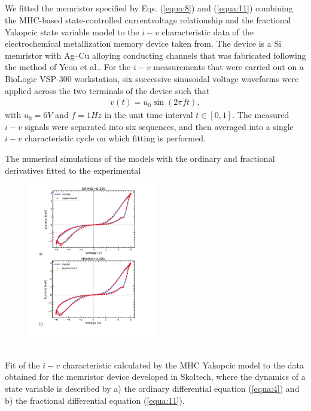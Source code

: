 \documentclass[10pt]{article}
\begin{document}
\begin{multicols}{2}
{        \section{ }
        }
        We fitted the memristor specified by Eqs. (\ref{equa:8}) and (\ref{equa:11}) combining the MHC-based state-controlled currentvoltage relationship and the fractional Yakopcic state variable model to the $i-v$ characteristic data of the electrochemical metallization memory device taken from. The device is a Si memristor with Ag–Cu alloying conducting channels that was fabricated following the method of Yeon et al.. For the $i-v$ measurements that were carried out on a BioLogic VSP-300 workstation, six successive sinusoidal voltage waveforms were applied across the two terminals of the device such that
        \begin{align}
            v(t) = u_0 \sin(2\pi ft), \label{equa:27}
        \end{align}
        with $u_0 = 6 V$ and $f = 1 Hz$ in the unit time interval $t \in [0,1]$. The measured $i-v$ signals were separated into six sequences, and then averaged into a single $i-v$ characteristic cycle on which fitting is performed. \par
        The numerical simulations of the models with the ordinary and fractional derivatives fitted to the experimental
        \\
        \begin{figure}
        \includegraphics[width=0.5\textwidth]{latex_graph.png}
        \end{figure}
        \\
        Fit of the $i-v$ characteristic calculated by the MHC Yakopcic model to the data obtained for the memristor device developed in Skoltech, where the dynamics of a state variable is described by a) the ordinary differential equation (\ref{equa:4}) and b) the fractional differential equation (\ref{equa:11}).

\end{multicols}
\end{document}
